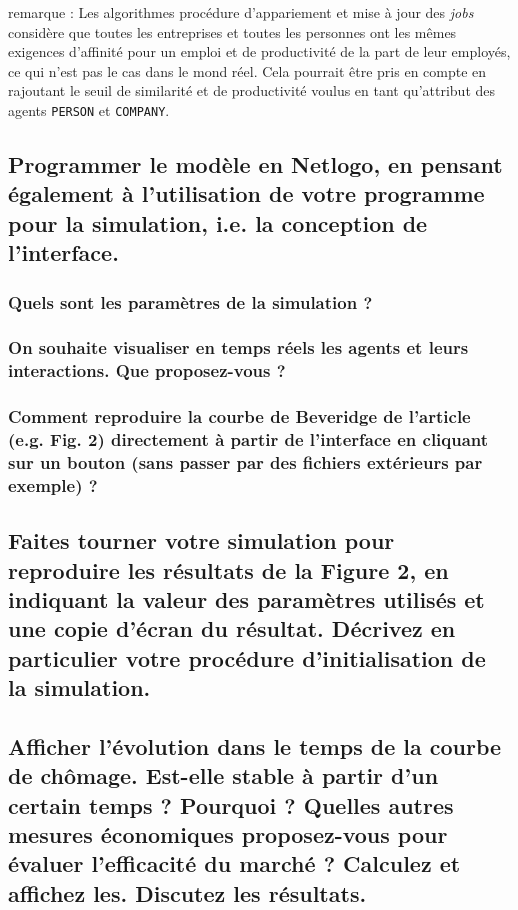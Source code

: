 \documentclass[10pt,a4paper]{article}
\begin{document}
    \vspace{0.5cm}
    
    remarque : Les algorithmes procédure d'appariement et mise à jour des \emph{jobs} considère que toutes les entreprises et toutes les personnes ont les mêmes exigences d'affinité pour un emploi et de productivité de la part de leur employés, ce qui n'est pas le cas dans le mond réel. Cela pourrait être pris en compte en rajoutant le seuil de similarité et de productivité voulus en tant qu'attribut des agents \texttt{PERSON} et \texttt{COMPANY}.
    
    
    
    \subsection{Programmer le modèle en Netlogo, en pensant également à l'utilisation de votre programme pour la simulation, i.e. la conception de l'interface.}
    
    \subsubsection{Quels sont les paramètres de la simulation ?}
    
    \subsubsection{On souhaite visualiser en temps réels les agents et leurs interactions. Que proposez-vous ?}
    
    \subsubsection{ Comment reproduire la courbe de Beveridge de l'article (e.g. Fig. 2) directement à partir de l'interface en cliquant sur un bouton (sans passer par des fichiers extérieurs par exemple) ?}
    
    \subsection{Faites tourner votre simulation pour reproduire les résultats de la Figure 2, en indiquant la valeur des paramètres utilisés et une copie d'écran du résultat. Décrivez en particulier votre procédure d'initialisation de la simulation.}
    
    \subsection{Afficher l'évolution dans le temps de la courbe de chômage. Est-elle stable à partir d'un certain temps ? Pourquoi ? Quelles autres mesures économiques proposez-vous pour évaluer l'efficacité du marché ? Calculez et affichez les. Discutez les résultats.}
    
\end{document}
